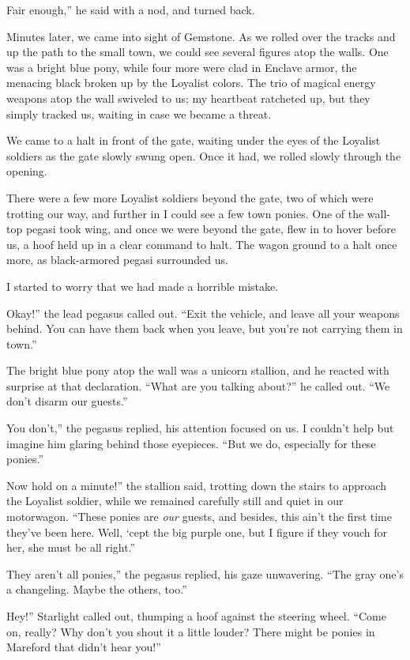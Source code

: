 \leavevmode{}Fair enough,” he said with a nod, and turned back.

Minutes later, we came into sight of Gemstone. As we rolled over the tracks and up the path to the small town, we could see several figures atop the walls. One was a bright blue pony, while four more were clad in Enclave armor, the menacing black broken up by the Loyalist colors. The trio of magical energy weapons atop the wall swiveled to us; my heartbeat ratcheted up, but they simply tracked us, waiting in case we became a threat.

We came to a halt in front of the gate, waiting under the eyes of the Loyalist soldiers as the gate slowly swung open. Once it had, we rolled slowly through the opening.

There were a few more Loyalist soldiers beyond the gate, two of which were trotting our way, and further in I could see a few town ponies. One of the wall-top pegasi took wing, and once we were beyond the gate, flew in to hover before us, a hoof held up in a clear command to halt. The wagon ground to a halt once more, as black-armored pegasi surrounded us.

I started to worry that we had made a horrible mistake.

\leavevmode{}Okay!” the lead pegasus called out. “Exit the vehicle, and leave all your weapons behind. You can have them back when you leave, but you’re not carrying them in town.”

The bright blue pony atop the wall was a unicorn stallion, and he reacted with surprise at that declaration. “What are you talking about?” he called out. “We don’t disarm our guests.”

\leavevmode{}You don’t,” the pegasus replied, his attention focused on us. I couldn’t help but imagine him glaring behind those eyepieces. “But we do, especially for these ponies.”

\leavevmode{}Now hold on a minute!” the stallion said, trotting down the stairs to approach the Loyalist soldier, while we remained carefully still and quiet in our motorwagon. “These ponies are \textit{our} guests, and besides, this ain’t the first time they’ve been here. Well, ‘cept the big purple one, but I figure if they vouch for her, she must be all right.”

\leavevmode{}They aren’t all ponies,” the pegasus replied, his gaze unwavering. “The gray one’s a changeling. Maybe the others, too.”

\leavevmode{}Hey!” Starlight called out, thumping a hoof against the steering wheel. “Come on, really? Why don’t you shout it a little louder? There might be ponies in Mareford that didn’t hear you!”

